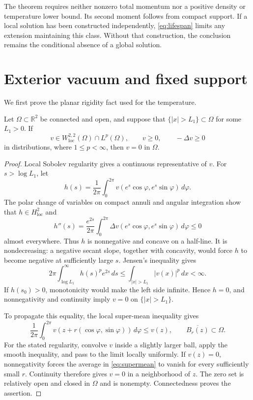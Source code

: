 \documentclass[10pt,twoside]{article}
\newcommand{\R}{\mathbb R}
\newcommand{\dd}{\,dx}
\begin{document}
The theorem requires neither nonzero total momentum nor a positive
density or temperature lower bound. Its second moment follows from
compact support. If a local solution has been constructed
independently, \eqref{eq:lifespan} limits any extension maintaining
this class. Without that construction, the conclusion remains the
conditional absence of a global solution.

\section{Exterior vacuum and fixed support}\label{sec:exterior}

We first prove the planar rigidity fact used for the temperature.

\begin{lemma}\label{lem:superharmonic}
Let $\Omega\subset\R^2$ be connected and open, and suppose that
$\{|x|>L_1\}\subset\Omega$ for some $L_1>0$. If
\[
 v\in W^{2,2}_{\mathrm{loc}}(\Omega)\cap L^p(\Omega),\qquad
 v\ge0,\qquad -\Delta v\ge0
\]
in distributions, where $1\le p<\infty$, then $v=0$ in $\Omega$.
\end{lemma}

\begin{proof}
Local Sobolev regularity gives a continuous representative of $v$.
For $s>\log L_1$, let
\[
 h(s)=\frac1{2\pi}\int_0^{2\pi}
           v(e^s\cos\varphi,e^s\sin\varphi)\,d\varphi.
\]
The polar change of variables on compact annuli and angular
integration show that $h\in H^2_{\mathrm{loc}}$ and
\begin{equation}
 h''(s)=\frac{e^{2s}}{2\pi}\int_0^{2\pi}
             \Delta v(e^s\cos\varphi,e^s\sin\varphi)\,d\varphi
       \le0
 \label{eq:concavemean}
\end{equation}
almost everywhere. Thus $h$ is nonnegative and concave on a half-line.
It is nondecreasing: a negative secant slope, together with concavity,
would force $h$ to become negative at sufficiently large $s$.
Jensen's inequality gives
\begin{equation}
 2\pi\int_{\log L_1}^{\infty} h(s)^p e^{2s}\,ds
       \le\int_{|x|>L_1}|v(x)|^p\dd<\infty.
 \label{eq:meanLp}
\end{equation}
If $h(s_0)>0$, monotonicity would make the left side infinite.
Hence $h=0$, and nonnegativity and continuity imply $v=0$ on
$\{|x|>L_1\}$.

To propagate this equality, the local super-mean inequality gives
\begin{equation}
 \frac1{2\pi}\int_0^{2\pi}
       v(z+r(\cos\varphi,\sin\varphi))\,d\varphi\le v(z),
 \qquad \overline{B_r(z)}\subset\Omega.
 \label{eq:supermean}
\end{equation}
For the stated regularity, convolve $v$ inside a slightly larger
ball, apply the smooth inequality, and pass to the limit locally
uniformly. If $v(z)=0$, nonnegativity forces the average in
\eqref{eq:supermean} to vanish for every sufficiently small $r$.
Continuity therefore gives $v=0$ in a neighborhood of $z$.
The zero set is relatively open and closed in $\Omega$ and is
nonempty. Connectedness proves the assertion.
\end{proof}
\end{document}
